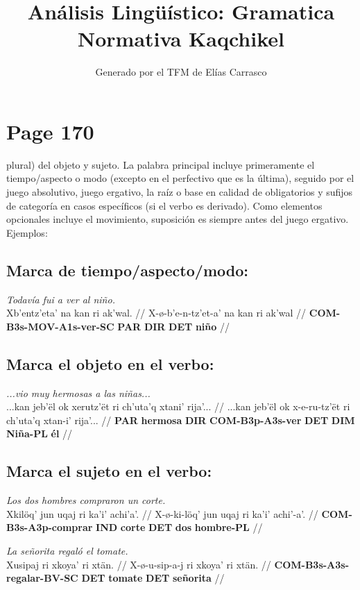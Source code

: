 \documentclass{article}%
\title{Análisis Lingüístico: Gramatica Normativa Kaqchikel}%
\author{Generado por el TFM de Elías Carrasco}%
\begin{document}
%
\normalsize%
\maketitle%
\section{Page 170}%
\label{sec:Page170}%
plural) del objeto y sujeto. La palabra principal incluye primeramente el tiempo/aspecto %
o modo (excepto en el perfectivo que es la última), seguido por el juego absolutivo, %
juego ergativo, la raíz o base en calidad de obligatorios y sufijos de categoría en casos %
específicos (si el verbo es derivado). Como elementos opcionales incluye el movimiento, %
suposición es siempre antes del juego ergativo. Ejemplos: %
\subsection{Marca de tiempo/aspecto/modo:}%
\label{subsec:Marcadetiempo/aspecto/modo}%

%
\par\medskip%
\ex
\textit{Todavía fui a ver al niño.} \\
\begingl
\gla Xb'entz'eta' na kan ri ak'wal. //
\glb X-ø-b'e-n-tz'et-a' na kan ri ak'wal //
\glc \textbf{COM-B3s-MOV-A1s-ver-SC} \textbf{PAR} \textbf{DIR} \textbf{DET} \textbf{niño} //
\endgl
\xe
%
\medskip%
\subsection{Marca el objeto en el verbo:}%
\label{subsec:Marcaelobjetoenelverbo}%

%
\par\medskip%
\ex
\textit{...vio muy hermosas a las niñas...} \\
\begingl
\gla ...kan jeb'ël ok xerutz'ët ri ch'uta'q xtani' rija'... //
\glb ...kan jeb'ël ok x-e-ru-tz'ët ri ch'uta'q xtan-i' rija'... //
\glc \textbf{PAR} \textbf{hermosa} \textbf{DIR} \textbf{COM-B3p-A3s-ver} \textbf{DET} \textbf{DIM} \textbf{Niña-PL} \textbf{él} //
\endgl
\xe
%
\medskip%
\subsection{Marca el sujeto en el verbo:}%
\label{subsec:Marcaelsujetoenelverbo}%

%
\par\medskip%
\ex
\textit{Los dos hombres compraron un corte.} \\
\begingl
\gla Xkilöq' jun uqaj ri ka'i' achi'a'. //
\glb X-ø-ki-löq' jun uqaj ri ka'i' achi'-a'. //
\glc \textbf{COM-B3s-A3p-comprar} \textbf{IND} \textbf{corte} \textbf{DET} \textbf{dos} \textbf{hombre-PL} //
\endgl
\xe
%
\medskip%
\par\medskip%
\ex
\textit{La señorita regaló el tomate.} \\
\begingl
\gla Xusipaj ri xkoya' ri xtän. //
\glb X-ø-u-sip-a-j ri xkoya' ri xtän. //
\glc \textbf{COM-B3s-A3s-regalar-BV-SC} \textbf{DET} \textbf{tomate} \textbf{DET} \textbf{señorita} //
\endgl
\xe
%
\medskip%
\end{document}
